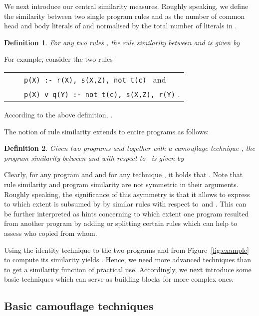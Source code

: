 \documentclass{tlp}
\newcommand{\wrt}[0]{with respect to}
\newtheorem{definition}{Definition}
\begin{document}
We next introduce our central similarity measures.
Roughly speaking, we define the similarity between two single program rules  and  as
the number of common head and body literals of  and  normalised by the total number of
literals in . 

\begin{definition}\label{def:rulesim}
For any two rules , 
the \emph{rule similarity between  and } is given by

\end{definition}

For example, consider the two rules
\begin{center}
\begin{tabular}{l@{}c@{}l}
 &   &{\tt \small p(X) :- r(X), s(X,Z), not t(c)} \ and \\
 &  & {\tt \small p(X) v q(Y) :- not\ t(c), s(X,Z), r(Y)} .
\end{tabular}
\end{center}
According to the above definition, .

The notion of rule similarity extends to entire programs as follows:

\begin{definition}\label{def:progsim}
Given two programs  and  together with a camouflage technique ,
 the \emph{program similarity between  and  \wrt\ } is given by

\end{definition}

Clearly, for any program  and  and for any technique , it holds that
.
Note that rule similarity and  program similarity are not symmetric in their arguments.
 Roughly speaking, the significance of this asymmetry is that it allows to express
to which extent  is subsumed by  by similar rules \wrt\  and .
This can be further interpreted as hints concerning to which extent one program resulted from another program
by adding or splitting certain rules which can help to assess who copied from whom.

Using the  identity technique to the two programs  and  from
Figure~\ref{fig:example} to compute its similarity yields
. 
Hence, we need more advanced techniques than
 to get a similarity function of practical use. 
Accordingly, we next introduce some basic techniques which can serve as building blocks for more complex ones.

\subsection{Basic camouflage techniques}\label{subsec:techniques}
\end{document}

